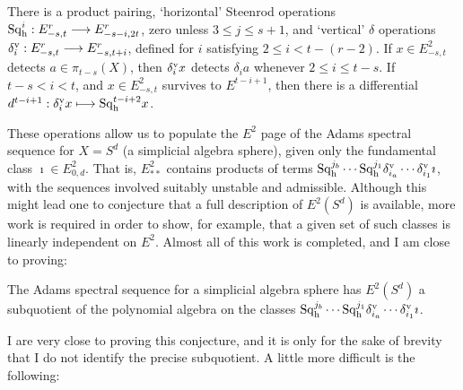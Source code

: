 \documentclass[11pt]{article}
\newcommand{\Sq}{\mathrm{Sq}}
\begin{document}
\begin{thm*}\label{adamsOperationsOmnibus}
There is a product pairing, `horizontal' Steenrod operations $\Sq^i_\textup{h}:E^r_{-s,t}\to E^r_{-s-i,2t}$, zero unless $3\leq j\leq s+1$, and `vertical' $\delta$ operations $\delta_i^\textup{v}:E^r_{-s,t}\to E^r_{-s,t+i}$, defined for $i$ satisfying $2\leq i<t-(r-2)$. If $x\in E^2_{-s,t}$ detects $a\in\pi_{t-s}(X)$, then $\delta_i^\textup{v}x$ detects $\delta_ia$ whenever $2\leq i\leq t-s$. If $t-s<i<t$, and $x\in E^2_{-s,t}$ survives to $E^{t-i+1}$, then there is a differential $d^{t-i+1}:\delta_i^\textup{v}x\mapsto \Sq_\textup{h}^{t-i+2}x$.
\end{thm*}
These operations allow us to populate the $E^2$ page of the Adams spectral sequence for $X=S^d$ (a simplicial algebra sphere), given only the fundamental class $\imath\in E^2_{0,d}$. That is, $E^2_{**}$ contains products of terms $\Sq^{j_b}_\textup{h}\cdots \Sq^{j_1}_\textup{h}\delta_{i_a}^\textup{v}\cdots \delta_{i_1}^\textup{v}\imath$, with the sequences involved suitably unstable and admissible. Although this might lead one to conjecture that a full description of $E^2(S^d)$ is available, more work is required in order to show, for example, that a given set of such classes is linearly independent on $E^2$. Almost all of this work is completed, and I am close to proving:
\begin{conjecture}
The Adams spectral sequence for a simplicial algebra sphere has $E^2(S^d)$ a subquotient of the polynomial algebra on the classes $\Sq^{j_b}_\textup{h}\cdots \Sq^{j_1}_\textup{h}\delta_{i_a}^\textup{v}\cdots \delta_{i_1}^\textup{v}\imath$.
\end{conjecture}
I are very close to proving this conjecture, and it is only for the sake of brevity that I do not identify the precise subquotient. A little more difficult is the following:
\end{document}
